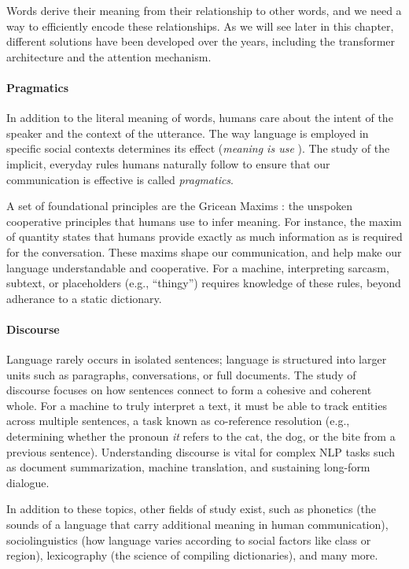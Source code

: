 Words derive their meaning from their relationship to other words, and we need a way to efficiently encode these relationships. As we will see later in this chapter, different solutions have been developed over the years, including the transformer architecture and the attention mechanism.
    
\paragraph{Pragmatics} In addition to the literal meaning of words, humans care about the intent of the speaker and the context of the utterance. The way language is employed in specific social contexts determines its effect ({\em meaning is use} \citep{baker2008wittgenstein}). The study of the implicit, everyday rules humans naturally follow to ensure that our communication is effective is called {\em pragmatics}. 

A set of foundational principles are the Gricean Maxims \citep{Grice_1975}: the unspoken cooperative principles that humans use to infer meaning. For instance, the maxim of quantity states that humans provide exactly as much information as is required for the conversation. These maxims shape our communication, and help make our language understandable and cooperative. For a machine, interpreting sarcasm, subtext, or placeholders (e.g., ``thingy'') requires knowledge of these rules, beyond adherance to a static dictionary.

\paragraph{Discourse} Language rarely occurs in isolated sentences; language is structured into larger units such as paragraphs, conversations, or full documents. The study of discourse focuses on how sentences connect to form a cohesive and coherent whole. For a machine to truly interpret a text, it must be able to track entities across multiple sentences, a task known as co-reference resolution (e.g., determining whether the pronoun {\em it} refers to the cat, the dog, or the bite from a previous sentence). Understanding discourse is vital for complex NLP tasks such as document summarization, machine translation, and sustaining long-form dialogue.

In addition to these topics, other fields of study exist, such as phonetics (the sounds of a language that carry additional meaning in human communication), sociolinguistics (how language varies according to social factors like class or region), lexicography (the science of compiling dictionaries), and many more. 

